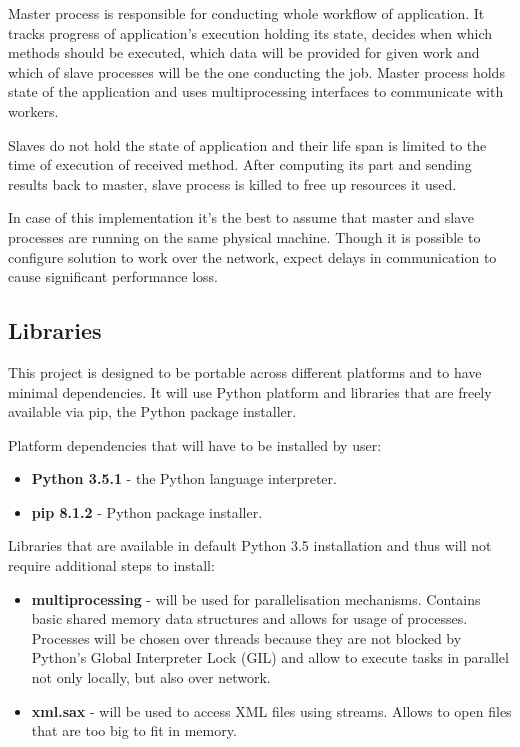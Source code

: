 Master process is responsible for conducting whole workflow of application. It tracks progress of application's execution holding its state, decides when which methods should be executed, which data will be provided for given work and which of slave processes will be the one conducting the job. Master process holds state of the application and uses multiprocessing interfaces to communicate with workers.

Slaves do not hold the state of application and their life span is limited to the time of execution of received method. After computing its part and sending results back to master, slave process is killed to free up resources it used.

In case of this implementation it's the best to assume that master and slave processes are running on the same physical machine. Though it is possible to configure solution to work over the network, expect delays in communication to cause significant performance loss.
 
\subsection{Libraries} \label{design-libraries}
This project is designed to be portable across different platforms and to have minimal dependencies. It will use Python platform and libraries that are freely available via pip, the Python package installer.

Platform dependencies that will have to be installed by user:
\begin{itemize}
	\item \textbf{Python 3.5.1} - the Python language interpreter.
	\item\textbf{pip 8.1.2} - Python package installer.
\end{itemize}

Libraries that are available in default Python 3.5 installation and thus will not require additional steps to install:
\begin{itemize}
	\item \textbf{multiprocessing} - will be used for parallelisation mechanisms. Contains basic shared memory data structures and allows for usage of processes. Processes will be chosen over threads because they are not blocked by Python's Global Interpreter Lock (GIL) and allow to execute tasks in parallel not only locally, but also over network.
	\item \textbf{xml.sax} - will be used to access XML files using streams. Allows to open files that are too big to fit in memory.
\end{itemize}

